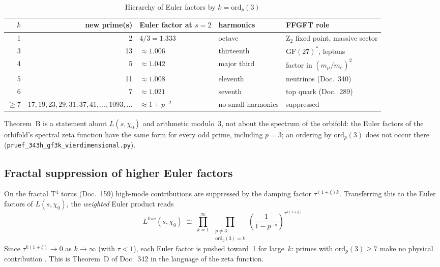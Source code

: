 \begin{table}[H]
\centering
\caption{Hierarchy of Euler factors by $k = \mathrm{ord}_p(3)$}
\begin{tabular}{rrlll}
\toprule
$k$ & new prime(s) & Euler factor at $s=2$ & harmonics & FFGFT role \\
\midrule
1 & 2 & $4/3 = 1.333$ & octave & Z$_2$ fixed point, massive sector \\
3 & 13 & $\approx 1.006$ & thirteenth & GF$(27)^*$, leptons \\
4 & 5 & $\approx 1.042$ & major third & factor in $(m_\mu/m_e)^2$ \\
5 & 11 & $\approx 1.008$ & eleventh & neutrinos (Doc.~340) \\
6 & 7 & $\approx 1.021$ & seventh & top quark (Doc.~289) \\
$\geq 7$ & $17, 19, 23, 29, 31, 37, 41, \ldots, 1093,\ldots$ & $\approx 1+p^{-2}$ & no small harmonics & suppressed \\
\bottomrule
\end{tabular}
\end{table}

Theorem~B is a statement about $L(s,\chi_0)$ and arithmetic modulo~3, not about
the spectrum of the orbifold: the Euler factors of the orbifold's spectral zeta
function have the same form for every odd prime, including $p=3$; an ordering by
$\mathrm{ord}_p(3)$ does not occur there (\texttt{pruef\_343h\_gf3k\_vierdimensional.py}).

\subsection{Fractal suppression of higher Euler factors}

On the fractal T$^4$ torus (Doc.~159) high-mode contributions are suppressed
by the damping factor $\tau^{(1+\xi)k}$. Transferring this to the Euler factors
of $L(s,\chi_0)$, the \emph{weighted} Euler product reads
\begin{equation}
  L^{\mathrm{frac}}(s,\chi_0)
  \;\cong\; \prod_{k=1}^{\infty}\;
  \prod_{\substack{p\neq 3\\ \mathrm{ord}_p(3)=k}}
  \left(\frac{1}{1-p^{-s}}\right)^{\!\tau^{k(1+\xi)}}
\end{equation}
Since $\tau^{k(1+\xi)} \to 0$ as $k\to\infty$ (with $\tau<1$), each Euler factor is pushed
toward~1 for large~$k$: primes with $\mathrm{ord}_p(3) \geq 7$ make no physical
contribution \BM. This is Theorem~D of Doc.~342 in the language of the zeta function.

